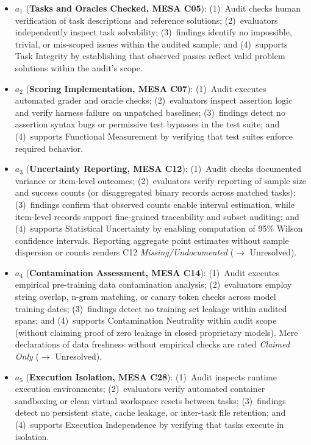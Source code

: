 \documentclass[runningheads]{llncs}
\begin{document}
\begin{itemize}[leftmargin=*]
    \item $a_1$ (\textbf{Tasks and Oracles Checked, MESA C05}): (1)~Audit checks human verification of task descriptions and reference solutions; (2)~evaluators independently inspect task solvability; (3)~findings identify no impossible, trivial, or mis-scoped issues within the audited sample; and (4)~supports Task Integrity by establishing that observed passes reflect valid problem solutions within the audit's scope.
    \item $a_2$ (\textbf{Scoring Implementation, MESA C07}): (1)~Audit executes automated grader and oracle checks; (2)~evaluators inspect assertion logic and verify harness failure on unpatched baselines; (3)~findings detect no assertion syntax bugs or permissive test bypasses in the test suite; and (4)~supports Functional Measurement by verifying that test suites enforce required behavior.
    \item $a_3$ (\textbf{Uncertainty Reporting, MESA C12}): (1)~Audit checks documented variance or item-level outcomes; (2)~evaluators verify reporting of sample size and success counts (or disaggregated binary records across matched tasks); (3)~findings confirm that observed counts enable interval estimation, while item-level records support fine-grained traceability and subset auditing; and (4)~supports Statistical Uncertainty by enabling computation of 95\% Wilson confidence intervals. Reporting aggregate point estimates without sample dispersion or counts renders C12 \emph{Missing/Undocumented} ($\to$ Unresolved).
    \item $a_4$ (\textbf{Contamination Assessment, MESA C14}): (1)~Audit executes empirical pre-training data contamination analysis; (2)~evaluators employ string overlap, n-gram matching, or canary token checks across model training dates; (3)~findings detect no training set leakage within audited spans; and (4)~supports Contamination Neutrality within audit scope (without claiming proof of zero leakage in closed proprietary models). Mere declarations of data freshness without empirical checks are rated \emph{Claimed Only} ($\to$ Unresolved).
    \item $a_5$ (\textbf{Execution Isolation, MESA C28}): (1)~Audit inspects runtime execution environments; (2)~evaluators verify automated container sandboxing or clean virtual workspace resets between tasks; (3)~findings detect no persistent state, cache leakage, or inter-task file retention; and (4)~supports Execution Independence by verifying that tasks execute in isolation.
\end{itemize}
\end{document}
